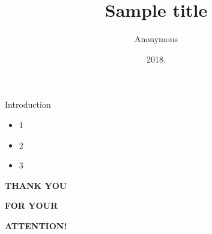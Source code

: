 \documentclass[bigger]{beamer}
\title{\bf Sample title}
\author{Anonymous}
\institute{Eötvös Loránd University (ELTE), \\ Budapest, Hungary}
\date{2018.}
\begin{document}
{
%
\frame{\vspace{15mm}\titlepage}
}

\begin{frame}{Introduction}
\begin{itemize}
\item 1
\item 2
\item 3
\end{itemize}
\end{frame}


{
%
\begin{frame}{}

\bigskip\bigskip\bigskip

{\bf\Huge\color{white} THANK YOU}

\bigskip

{\bf\Huge\color{white} FOR YOUR}

\bigskip

{\bf\Huge\color{white} ATTENTION!}

\end{frame}
}
\end{document}
